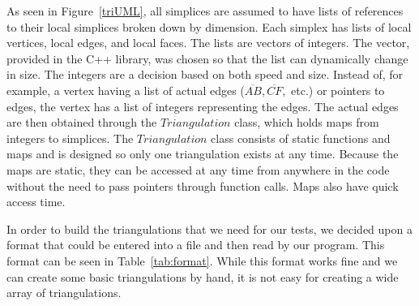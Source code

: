 \documentclass[12pt]{article}
\begin{document}
 As seen in Figure~\ref{triUML}, all simplices are assumed to have lists of references to their local simplices broken down by dimension. Each simplex has lists of local vertices, local edges, and local faces. The lists are vectors of integers. The vector, provided in the C++ library, was chosen so that the list can dynamically change in size. The integers are a decision based on both speed and size. Instead of, for example, a vertex having a list of actual edges ($\overline{AB}, \overline{CF},$ etc.) or pointers to edges, the vertex has a list of integers representing the edges. The actual edges are then obtained through the $Triangulation$ class, which holds maps from integers to simplices. The $Triangulation$ class consists of static functions and maps and is designed so only one triangulation exists at any time. Because the maps are static, they can be accessed at any time from anywhere in the code without the need to pass pointers through function calls. Maps also have quick access time.

 In order to build the triangulations that we need for our tests, we decided upon a format that could be entered into a file and then read by our program. This format can be seen in Table~\ref{tab:format}. While this format works fine and we can create some basic triangulations by hand, it is not easy for creating a wide array of triangulations.
\end{document}
